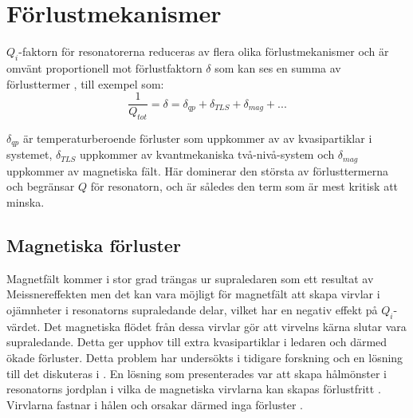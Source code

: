 \documentclass[main.tex]{subfiles}
\begin{document}


\section{Förlustmekanismer}
\label{sec:losses}
$Q_i$-faktorn för resonatorerna reduceras av flera olika förlustmekanismer och är omvänt proportionell mot förlustfaktorn $\delta$ som kan ses en summa av förlusttermer \cite{Boehme2016,Goetz2016}, till exempel som:
\begin{equation}
    \label{ekv:Qtot}
    \frac{1}{Q_{tot}}=\delta=\delta_{qp}+\delta_{TLS}+\delta_{mag}+...
\end{equation}
\noindent

$\delta_{qp}$ är temperaturberoende förluster som uppkommer av av kvasipartiklar i systemet, $\delta_{TLS}$ uppkommer av kvantmekaniska två-nivå-system och $\delta_{mag}$ uppkommer av magnetiska fält. Här dominerar den största av förlusttermerna och begränsar $Q$ för resonatorn, och är således den term som är mest kritisk att minska.



\subsection{Magnetiska förluster}
\label{sek:mag}
Magnetfält kommer i stor grad trängas ur supraledaren som ett resultat av Meissnereffekten \cite{Kittel2005} men det kan vara möjligt för magnetfält att skapa virvlar i ojämnheter i resonatorns supraledande delar, vilket har en negativ effekt på $Q_i$-värdet. Det magnetiska flödet från dessa virvlar gör att virvelns kärna slutar vara supraledande. Detta ger upphov till extra kvasipartiklar i ledaren och därmed ökade förluster. Detta problem har undersökts i tidigare forskning och en lösning till det diskuteras i \cite{Chiaro2016}. En lösning som presenterades var att skapa hålmönster i resonatorns jordplan i vilka de magnetiska virvlarna kan skapas förlustfritt \cite{Chiaro2016}. Virvlarna fastnar i hålen och orsakar därmed inga förluster \cite{Chiaro2016}.
\end{document}
